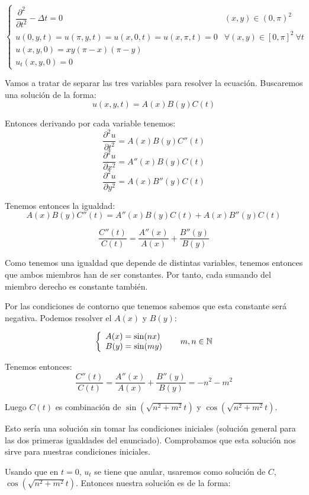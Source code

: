 \documentclass[openany]{book}
\begin{document}
\begin{example}

  $$ \left\{
  \begin{array}{ll}
    \dfrac{\partial ^2}{\partial t^2}- \Delta t = 0 & (x,y) \in (0,\pi)^2\\ 
    u(0,y,t) = u(\pi,y,t) = u(x,0,t) = u(x,\pi,t) = 0 & \forall  (x,y) \in [0,\pi]^2\ \forall t\\ 
    u(x,y,0) = xy(\pi-x)(\pi-y)\\ 
    u_{t}(x,y,0) = 0
  \end{array}
  \right. $$

  Vamos a tratar de separar las tres variables para resolver la ecuación. Buscaremos una solución de la forma:
  $$ u(x,y,t) = A(x)B(y)C(t) $$

  Entonces derivando por cada variable tenemos:
  $$ \dfrac{\partial ^2 u}{\partial t^2} = A(x)B(y)C''(t) $$
  $$ \dfrac{\partial ^2 u}{\partial x^2} = A''(x)B(y)C(t) $$
  $$ \dfrac{\partial ^2u}{\partial y^2} = A(x)B''(y)C(t) $$

  Tenemos entonces la igualdad:
  $$ A(x)B(y)C''(t) = A''(x)B(y)C(t) + A(x)B''(y)C(t) $$

  $$ \dfrac{C''(t)}{C(t)} = \dfrac{A''(x)}{A(x)} + \dfrac{B''(y)}{B(y)} $$

  Como tenemos una igualdad que depende de distintas variables, tenemos entonces que ambos miembros han de ser constantes. Por tanto, cada sumando del miembro derecho es constante también.

  Por las condiciones de contorno que tenemos sabemos que esta constante será negativa. Podemos resolver el $ A(x) $ y $ B(y) $:

  $$ \left\{
  \begin{array}{l}
    A(x) = \sin(nx)\\ 
    B(y) = \sin(my)
  \end{array}
  \right.\hspace{5mm} m,n \in \mathbb{N}  $$

  Tenemos entonces:
  $$\dfrac{C''(t)}{C(t)}  =  \dfrac{A''(x)}{A(x)} + \dfrac{B''(y)}{B(y)} = -n^2-m^2 $$

  Luego $ C(t)  $ es combinación de $ \sin(\sqrt{n^2+m^2}t) $ y $ \cos(\sqrt{n^2+m^2}t) $.

  Esto sería una solución sin tomar las condiciones iniciales (solución general para las dos primeras igualdades del enunciado). Comprobamos que esta solución nos sirve para nuestras condiciones iniciales.

  Usando que en $ t=0 $, $ u_{t} $ se tiene que anular, usaremos como solución de $ C $, $ \cos(\sqrt{n^2+m^2}t) $. Entonces nuestra solución es de la forma:


\end{example}
\end{document}
